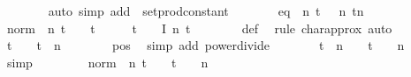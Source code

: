 {\ \ \ \ \ \ \isamarkupfalse%
\ {\isacharparenleft}auto\ simp\ add{\isacharcolon}\ {\isacharasterisk}\ setprod{\isacharunderscore}constant{\isacharparenright}\isanewline
\ \ \ \ \isamarkupfalse%
\ \isamarkupfalse%
\ {\isasymphi}{\isacharunderscore}eq{\isacharcolon}\ {\isachardoublequoteopen}{\isasymphi}\ n\ t\ {\isacharequal}\ {\isacharparenleft}{\isasympsi}\ n\ t{\isacharparenright}{\isacharcircum}n{\isachardoublequoteclose}\ \isacommand{{\isachardot}}\isamarkupfalse%
\isanewline
\isanewline
\ \ \ \ \isamarkupfalse%
\ {\isachardoublequoteopen}norm\ {\isacharparenleft}{\isasympsi}\ n\ t\ {\isacharminus}\ {\isacharparenleft}{}\ {\isacharminus}\ {\isacharquery}t{\isacharcircum}{}\ {\isacharasterisk}\ {\isasymsigma}\ {\isacharslash}\ {}{\isacharparenright}{\isacharparenright}\ {\isasymle}\ {\isacharquery}t\ {\isacharslash}\ {}\ {\isacharasterisk}\ {\isacharquery}I\ n\ t{\isachardoublequoteclose}\isanewline
\ \ \ \ \ \ \isamarkupfalse%
\ {\isasympsi}{\isacharunderscore}def\ \isamarkupfalse%
\ {\isacharparenleft}rule\ {\isasymmu}{\isachardot}char{\isacharunderscore}approx{}{\isacharcomma}\ auto{\isacharparenright}\isanewline
\ \ \ \ \isamarkupfalse%
\ \isamarkupfalse%
\ {\isachardoublequoteopen}{\isacharquery}t{\isacharcircum}{}\ {\isacharasterisk}\ {\isasymsigma}\ {\isacharequal}\ t{\isacharcircum}{}\ {\isacharslash}\ n{\isachardoublequoteclose}\isanewline
\ \ \ \ \ \ \isamarkupfalse%
\ {\isasymsigma}{\isacharunderscore}pos\ \isamarkupfalse%
\ {\isacharparenleft}simp\ add{\isacharcolon}\ power{\isacharunderscore}divide{\isacharparenright}\isanewline
\ \ \ \ \isamarkupfalse%
\ \isamarkupfalse%
\ {\isachardoublequoteopen}t{\isacharcircum}{}\ {\isacharslash}\ n\ {\isacharslash}\ {}\ {\isacharequal}\ {\isacharparenleft}t{\isacharcircum}{}\ {\isacharslash}\ {}{\isacharparenright}\ {\isacharslash}\ n{\isachardoublequoteclose}\isanewline
\ \ \ \ \ \ \isamarkupfalse%
\ simp\isanewline
\ \ \ \ \isamarkupfalse%
\ \isamarkupfalse%
\ {\isacharasterisk}{\isacharasterisk}{\isacharcolon}\ {\isachardoublequoteopen}norm\ {\isacharparenleft}{\isasympsi}\ n\ t\ {\isacharminus}\ {\isacharparenleft}{}\ {\isacharplus}\ {\isacharparenleft}{\isacharminus}{\isacharparenleft}t{\isacharcircum}{}{\isacharparenright}\ {\isacharslash}\ {}{\isacharparenright}\ {\isacharslash}\ n{\isacharparenright}{\isacharparenright}\ {\isasymle}\isanewline
}
